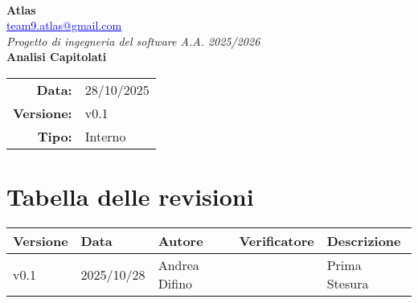 \documentclass[a4paper,12pt]{article}
\makeatletter
\newcommand{\Gruppo}{Atlas}
\newcommand{\Email}{\href{mailto:team9.atlas@gmail.com}{\textcolor{blue}{\underline{team9.atlas@gmail.com}}}}
\newcommand{\Titolo}{Analisi Capitolati}
\newcommand{\DataModifica}{28/10/2025}
\newcommand{\LogoGruppo}{img/AtlasLogo.png} %
\newcommand{\VersioneVerbale}{v0.1} %
\newcommand{\Interno}{Interno}
\makeatother
\begin{document}
\begin{titlepage}
    \centering

    \vspace*{0cm}
    \\[0.8cm]

    {\LARGE \textbf{\Gruppo}}\\[0.1cm]
    {\large \Email}\\[1.2cm]

    {\Large \textit{Progetto di ingegneria del software A.A. 2025/2026}}\\[1.5cm]

    {\Huge \textbf{\Titolo}}\\[1.5cm]

    \begin{tabular}{rl}
        \textbf{Data:} & \DataModifica \\
        \textbf{Versione:} & \VersioneVerbale \\
        \textbf{Tipo:} & \Interno \\
    \end{tabular}

\end{titlepage}


\section*{Tabella delle revisioni}{
    \begin{center} 
        \begin{tabular}{|l|l|l|l|l|}
            \hline
            \textbf{Versione} & \textbf{Data} & \textbf{Autore} & \textbf{Verificatore} & \textbf{Descrizione} \\
            \hline
            v0.1 & 2025/10/28 & Andrea Difino & & Prima Stesura \\
            \hline
        \end{tabular}
    \end{center}
}

\newpage

\tableofcontents
\end{document}
